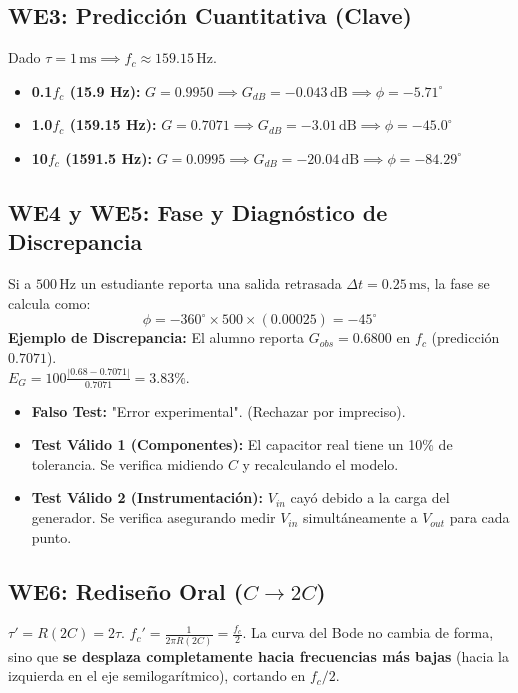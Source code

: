 \documentclass[11pt, a4paper]{article}
\begin{document}
\subsection*{WE3: Predicción Cuantitativa (Clave)}
Dado $\tau = 1\,\text{ms} \implies f_c \approx 159.15\,\text{Hz}$.
\begin{itemize}
    \item \textbf{0.1$f_c$ (15.9 Hz):} $G = 0.9950 \implies G_{dB} = -0.043\,\text{dB} \implies \phi = -5.71^\circ$
    \item \textbf{1.0$f_c$ (159.15 Hz):} $G = 0.7071 \implies G_{dB} = -3.01\,\text{dB} \implies \phi = -45.0^\circ$
    \item \textbf{10$f_c$ (1591.5 Hz):} $G = 0.0995 \implies G_{dB} = -20.04\,\text{dB} \implies \phi = -84.29^\circ$
\end{itemize}

\subsection*{WE4 y WE5: Fase y Diagnóstico de Discrepancia}
Si a $500\,\text{Hz}$ un estudiante reporta una salida retrasada $\Delta t = 0.25\,\text{ms}$, la fase se calcula como:
\[ \phi = -360^\circ \times 500 \times (0.00025) = -45^\circ \]
\textbf{Ejemplo de Discrepancia:} El alumno reporta $G_{obs} = 0.6800$ en $f_c$ (predicción $0.7071$). \\
$E_G = 100 \frac{|0.68 - 0.7071|}{0.7071} = 3.83\%$.
\begin{itemize}
    \item \textbf{Falso Test:} "Error experimental". (Rechazar por impreciso).
    \item \textbf{Test Válido 1 (Componentes):} El capacitor real tiene un 10\% de tolerancia. Se verifica midiendo $C$ y recalculando el modelo.
    \item \textbf{Test Válido 2 (Instrumentación):} $V_{in}$ cayó debido a la carga del generador. Se verifica asegurando medir $V_{in}$ simultáneamente a $V_{out}$ para cada punto.
\end{itemize}

\subsection*{WE6: Rediseño Oral ($C \to 2C$)}
$\tau' = R(2C) = 2\tau$. $f_c' = \frac{1}{2\pi R(2C)} = \frac{f_c}{2}$. La curva del Bode no cambia de forma, sino que \textbf{se desplaza completamente hacia frecuencias más bajas} (hacia la izquierda en el eje semilogarítmico), cortando en $f_c/2$.
\end{document}
